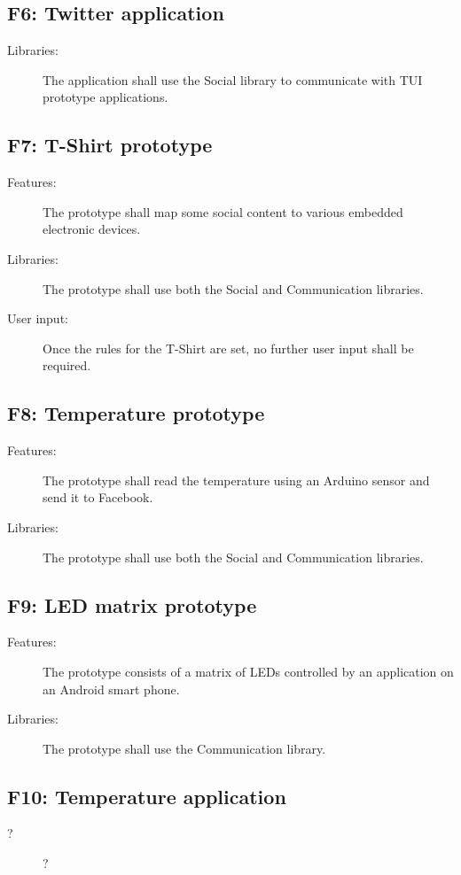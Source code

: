 \subsection{F6: Twitter application}
\begin{description}
	\item[Libraries:] The application shall use the Social library to
	communicate with TUI prototype applications.
\end{description}

\subsection{F7: T-Shirt prototype}
\begin{description}
	\item[Features:] The prototype shall map some social content to various
	embedded electronic devices.
	\item[Libraries:] The prototype shall use both the Social and Communication
	libraries.
	\item[User input:] Once the rules for the T-Shirt are set, no further user
	input shall be required.
\end{description}

\subsection{F8: Temperature prototype}
\begin{description}
	\item[Features:] The prototype shall read the temperature using an Arduino
	sensor and send it to Facebook.
	\item[Libraries:] The prototype shall use both the Social and Communication
	libraries.
\end{description}
	
	\subsection{F9: LED matrix prototype}
	\begin{description}
		\item[Features:] The prototype consists of a matrix of LEDs controlled by an application on 
		an Android smart phone.
		\item[Libraries:] The prototype shall use the Communication library.
		\item[]
	\end{description}

\subsection{F10: Temperature application}
\begin{description}
	\item[?] ?
\end{description}

